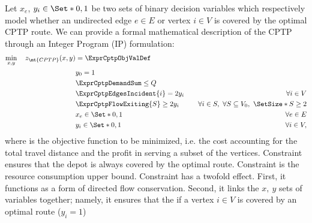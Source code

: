 Let $x_{e}$, $y_{i} \in \Set*{0, 1}$ be two sets of binary decision variables which respectively
model whether an undirected edge $e \in E$ or vertex $i \in V$ is covered by the optimal CPTP route.
We can provide a formal mathematical description of the CPTP through an Integer Program (IP) formulation:
\begin{align}
	\min_{x,y} \quad z_\mt{CPTP}(x, y) & = \ExprCptpObjValDef                     & \label{eq:cptp-obj-function}                                                                          \\
	                                   & y_0 = 1                                  & \label{eq:cptp-depot-part-of-tour-constraint}                                                         \\
	                                   & \ExprCptpDemandSum  \le Q                & \label{eq:cptp-resource-upper-bound-constraint}                                                       \\
	                                   & \ExprCptpEdgesIncident{i}  = 2 y_i       & \quad \forall i \in V         \label{eq:cptp-flow-conservation-constraint}                            \\
	                                   & \ExprCptpFlowExiting{S} \ge 2 y_{i}      & \quad \forall i \in S,\ \forall S \subseteq V_0,\ \SetSize*{S} \ge 2 \label{eq:cptp-gsec-constraints} \\
	                                   & x_{e}                   \in \Set*{0, 1}  & \quad \forall e \in E               \label{eq:cptp-x-mip-var-bounds}                                  \\
	                                   & y_{i}                    \in \Set*{0, 1} & \quad \forall i \in V             \label{eq:cptp-y-mip-var-bounds},
\end{align}
where  is the objective function to be minimized, i.e. the cost
accounting for the total travel distance and the profit in serving a subset of the vertices.
Constraint  ensures that the depot is always covered by the optimal route.
Constraint  is the resource consumption upper bound.
Constraint  has a twofold effect.
First, it functions as a form of directed flow conservation.
Second, it links the $x,\ y$ sets of variables together;
namely, it ensures that the if a vertex $i \in V$ is covered by an optimal route ($y_i = 1$)
